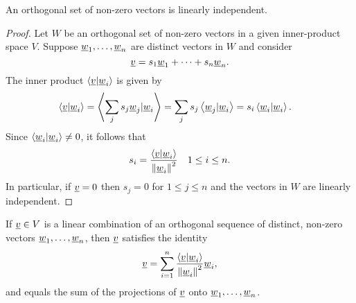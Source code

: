 \begin{theorem}
An orthogonal set of non-zero vectors is linearly independent.
\end{theorem}
\begin{proof}
Let $W$ be an orthogonal set of non-zero vectors in a given inner-product space $V$.
Suppose $\underline{w}_1, \ldots, \underline{w}_n$ are distinct vectors in $W$ and consider
\begin{equation*}
\underline{v} = s_1 \underline{w}_1 + \cdots + s_n \underline{w}_n.
\end{equation*}
The inner product $\left\langle \underline{v} | \underline{w}_i \right\rangle$ is given by
\begin{equation*}
\begin{split}
\left\langle \underline{v} | \underline{w}_i \right\rangle
&= \left\langle \sum_j s_j \underline{w}_j | \underline{w}_i \right\rangle
= \sum_j s_j \left\langle \underline{w}_j | \underline{w}_i \right\rangle
= s_i \left\langle \underline{w}_i | \underline{w}_i \right\rangle .
\end{split}
\end{equation*}
Since $\left\langle \underline{w}_i | \underline{w}_i \right\rangle \neq 0$, it follows that
\begin{equation*}
s_i = \frac{ \left\langle \underline{v} | \underline{w}_i \right\rangle }
{ \left\| \underline{w}_i \right\|^2 }
\quad 1 \leq i \leq n.
\end{equation*}
In particular, if $\underline{v} = 0$ then $s_j = 0$ for $1 \leq j \leq n$ and the vectors in $W$ are linearly independent.
\end{proof}

\begin{corollary}
If $\underline{v} \in V$ is a linear combination of an orthogonal sequence of distinct, non-zero vectors $\underline{w}_1, \ldots, \underline{w}_n$, then $\underline{v}$ satisfies the identity
\begin{equation*}
\underline{v} = \sum_{i = 1}^n \frac{ \left\langle \underline{v} | \underline{w}_i \right\rangle } { \left\| \underline{w}_i \right\|^2 } \underline{w}_i,
\end{equation*}
and equals the sum of the projections of $\underline{v}$ onto $\underline{w}_1, \ldots, \underline{w}_n$.
\end{corollary}

